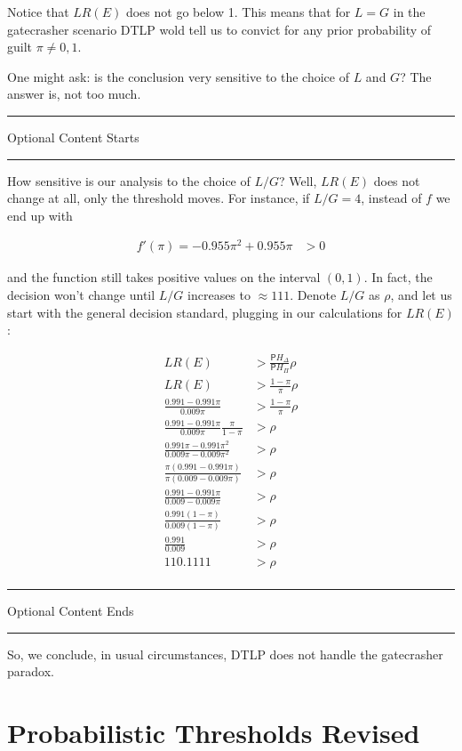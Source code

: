 \documentclass[10pt,dvipsnames,enabledeprecatedfontcommands]{scrartcl}
\newcommand{\pr}{\mathsf{P}}
\newcommand{\intermezzoa}{
	\begin{minipage}[c]{13cm}
	\begin{center}\rule{10cm}{0.4pt}



	\tiny{\sc Optional Content Starts}
	
	\vspace{-1mm}
	
	\rule{10cm}{0.4pt}\end{center}
	\end{minipage}\nopagebreak 
	}
\newcommand{\intermezzob}{\nopagebreak 
	\begin{minipage}[c]{13cm}
	\begin{center}\rule{10cm}{0.4pt}

	\tiny{\sc Optional Content Ends}
	
	\vspace{-1mm}
	
	\rule{10cm}{0.4pt}\end{center}
	\end{minipage}
	}
\begin{document}
\noindent Notice that \(LR(E)\) does not go below 1. This means that for
\(L=G\) in the gatecrasher scenario DTLP wold tell us to convict for any
prior probability of guilt \(\pi\neq 0,1\).

One might ask: is the conclusion very sensitive to the choice of \(L\)
and \(G\)? The answer is, not too much.

\intermezzoa

How sensitive is our analysis to the choice of \(L/G\)? Well, \(LR(E)\)
does not change at all, only the threshold moves. For instance, if
\(L/G=4\), instead of \(f\) we end up with

\begin{align*}
 f'(\pi) = - 0.955 \pi^2 + 0.955\pi &>0 
 \end{align*}

and the function still takes positive values on the interval \((0,1)\).
In fact, the decision won't change until \(L/G\) increases to
\(\approx 111\). Denote \(L/G\) as \(\rho\), and let us start with the
general decision standard, plugging in our calculations for \(LR(E)\):

\begin{align*}
LR(E) &> \frac{\pr{H_\Delta}}{\pr{H_\Pi}} \rho\\
LR(E) &> \frac{1-\pi}{\pi} \rho \\
\frac{0.991-0.991\pi}{0.009\pi} &> \frac{1-\pi}{\pi} \rho\\
\frac{0.991-0.991\pi}{0.009\pi}\frac{\pi}{1-\pi} &>  \rho\\
\frac{0.991\pi-0.991\pi^2}{0.009\pi-0.009\pi^2} &>  \rho\\
\frac{\pi(0.991-0.991\pi)}{\pi(0.009-0.009\pi)} &>  \rho\\
\frac{0.991-0.991\pi}{0.009-0.009\pi} &>  \rho\\
\frac{0.991(1-\pi)}{0.009(1-\pi)} &>  \rho\\
\frac{0.991}{0.009} &>  \rho\\
110.1111 &>  \rho\\
\end{align*}

\intermezzob

So, we conclude, in usual circumstances, DTLP does not handle the
gatecrasher paradox.

\section{Probabilistic Thresholds
Revised}\label{probabilistic-thresholds-revised}
\end{document}
